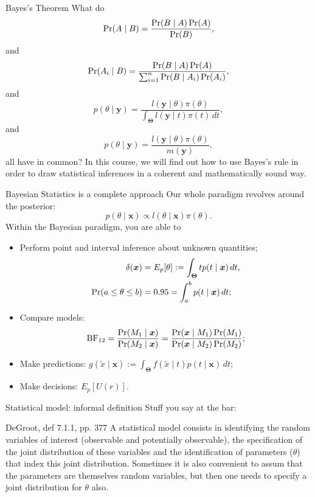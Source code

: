 \begin{frame}{Bayes's Theorem}
What do
\begin{equation}
 \label{eq:BT_1}
 \operatorname{Pr}(A \mid B) = \frac{\operatorname{Pr}(B \mid A)\operatorname{Pr}(A)}{\operatorname{Pr}(B)},
\end{equation}
and
\begin{equation}
 \label{eq:BT_2}
 \operatorname{Pr}(A_i \mid B) = \frac{\operatorname{Pr}(B \mid A)\operatorname{Pr}(A)}{\sum_{i=1}^n \operatorname{Pr}(B \mid A_i)\operatorname{Pr}(A_i)},
\end{equation}
and
\begin{equation}
 \label{eq:BT_3}
  p(\theta \mid \boldsymbol{y}) = \frac{l(\boldsymbol{y} \mid \theta)\pi(\theta)}{\int_{\boldsymbol{\Theta}} l(\boldsymbol{y} \mid t)\pi(t) \, dt},
\end{equation}
and
\begin{equation}
 \label{eq:BT_4}
  p(\theta \mid \boldsymbol{y}) = \frac{l(\boldsymbol{y} \mid \theta)\pi(\theta)}{m(\boldsymbol{y})},
\end{equation}
all have in common?
In this course, we will find out how to use Bayes's rule in order to draw statistical inferences in a coherent and mathematically sound way.
\end{frame}
\begin{frame}{Bayesian Statistics is a complete approach}
Our whole paradigm revolves around the posterior:
$$ p(\theta \mid \boldsymbol{x}) \propto l(\theta \mid \boldsymbol{x})\pi(\theta).$$
Within the Bayesian paradigm, you are able to
\begin{itemize}
 \item Perform point and interval inference about unknown quantities;
 \begin{align*}
  \delta(\boldsymbol{x}) &= E_p[\theta] := \int_{\boldsymbol{\Theta}} t p(t \mid \boldsymbol{x} )\,dt,\\
\operatorname{Pr}( a \leq \theta \leq b) &= 0.95 = \int_{a}^{b} p(t \mid \boldsymbol{x} )\,dt;
 \end{align*}
\item Compare models:
$$\operatorname{BF}_{12} = \frac{\operatorname{Pr}(M_1 \mid \boldsymbol{x})}{\operatorname{Pr}(M_2 \mid \boldsymbol{x})} = \frac{\operatorname{Pr}(\boldsymbol{x} \mid M_1)\operatorname{Pr}(M_1)}{\operatorname{Pr}(\boldsymbol{x} \mid M_2)\operatorname{Pr}(M_2)};$$
 \item Make predictions: $g(\tilde{x} \mid \boldsymbol{x}) := \int_{\boldsymbol{\Theta}} f(\tilde{x} \mid t)p(t\mid \boldsymbol{x})\,dt$;
 \item Make decisions: $E_p[U(r)]$.
\end{itemize} 
\end{frame}
\begin{frame}{Statistical model: informal definition}
Stuff you say at the bar:
\begin{defn}
\label{def:statistical_model_informal}
DeGroot, def 7.1.1, pp. 377
A statistical model consists in identifying the random variables of interest (observable and potentially observable), the specification of the joint distribution of these variables and the identification of parameters ($\theta$) that index this joint distribution.
Sometimes it is also convenient to assum that the parameters are themselves random variables, but then one needs to specify a joint distribution for $\theta$ also.
\end{defn} 
\end{frame}
